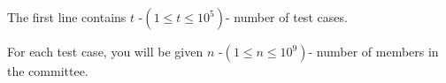 The first line contains $t$ -$(1 \le t \le 10^5) $- number of test cases.

For each test case, you will be given $n$ -$(1\le n \le 10^9)$- number of members in the committee.